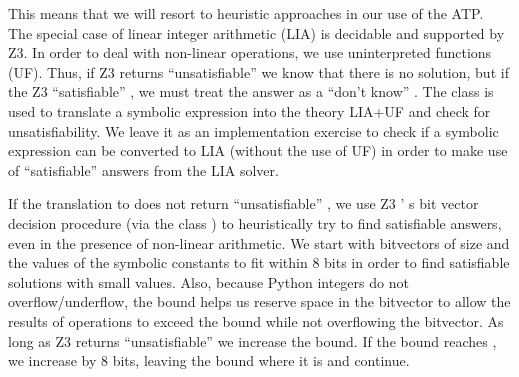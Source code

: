 \documentclass{IOS-Book-Article}
\begin{document}
\begin{mdP}[class={indent},data-line={853}]%
{}This means that we will resort to heuristic approaches in our use
of the%
{}{\mdNbsp}%
{} ATP.  The special case of linear integer arithmetic (LIA)
is decidable and supported by Z3. In order to deal with non-linear operations,
we use uninterpreted functions (UF). Thus, if Z3 returns
{}{\textquotedblleft}unsatisfiable{\textquotedblright}%
{} we know that there is no solution, but if the
Z3 %
{}{\textquotedblleft}satisfiable{\textquotedblright}%
{}, we must treat the answer as a %
{}{\textquotedblleft}don{'}t know{\textquotedblright}%
{}. 
The class %
{}%
{} is used to translate a symbolic expression
into the theory LIA+UF and check for unsatisfiability. We leave it as an
implementation exercise to check if a symbolic expression can
be converted to LIA (without the use of UF) in order to make
use of %
{}{\textquotedblleft}satisfiable{\textquotedblright}%
{} answers from the LIA solver.%
\end{mdP}%
\begin{mdP}[class={indent},data-line={865}]%
{}If the translation to %
{}%
{} does not return %
{}{\textquotedblleft}unsatisfiable{\textquotedblright}%
{}, we
use Z3%
{}{'}%
{}s bit vector decision procedure (via the class
{}%
{}) to heuristically
try to find satisfiable answers, even in the presence of non-linear 
arithmetic. We start with bitvectors of size %
{}%
{} and %
{}%
{} the values
of the symbolic constants to fit within 8 bits in order to find 
satisfiable solutions
with small values. Also, because Python integers do not overflow/underflow, 
the bound helps us reserve space in the bitvector to allow the
results of operations to exceed the bound while not overflowing
the bitvector. As long as Z3 returns %
{}{\textquotedblleft}unsatisfiable{\textquotedblright}%
{} we increase
the bound. If the bound reaches %
{}%
{}, we increase %
{}%
{} by 8 bits,
leaving the bound where it is and continue.%
\end{mdP}%
\end{document}
